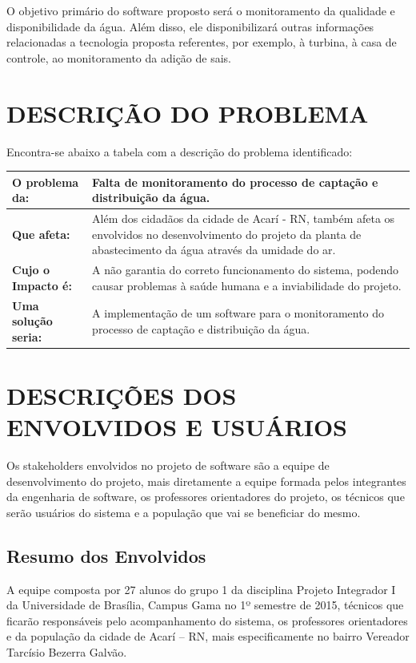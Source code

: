   O objetivo primário do software proposto será o monitoramento da qualidade e disponibilidade da água. Além disso, ele 
  disponibilizará outras informações relacionadas a tecnologia proposta referentes, por exemplo, à turbina, à casa de 
  controle, ao monitoramento da adição de sais.
  
  \section*{DESCRIÇÃO DO PROBLEMA}
  Encontra-se abaixo a tabela com a descrição do problema identificado:
  
   \begin{longtable}{|m{5.0cm}|m{11.2cm}|}
  \hline
\textbf{O problema da:} & Falta de monitoramento do processo de captação e distribuição da água.\\
  \hline
\textbf{Que afeta:} & Além dos cidadãos da cidade de Acarí - RN, também afeta os envolvidos no desenvolvimento do projeto da planta de abastecimento da água através da umidade do ar.\\
  \hline
\textbf{Cujo o Impacto é:} & A não garantia do correto funcionamento do sistema, podendo causar problemas à saúde humana e a inviabilidade do projeto.\\
  \hline
\textbf{Uma solução seria:} & A implementação de um software para o monitoramento do processo de captação e distribuição da água.\\
  \hline
 \end{longtable}
   
  \section*{DESCRIÇÕES DOS ENVOLVIDOS E USUÁRIOS}
  Os stakeholders envolvidos no projeto de software são a equipe de desenvolvimento do projeto, mais diretamente a equipe 
  formada pelos integrantes da engenharia de software, os professores orientadores do projeto, os técnicos que serão usuários 
  do sistema e a população que vai se beneficiar do mesmo.
  
  \subsection*{Resumo dos Envolvidos}
  A equipe composta por 27 alunos do grupo 1 da disciplina Projeto Integrador I da Universidade de Brasília, Campus Gama 
  no 1º semestre de 2015, técnicos que ficarão responsáveis pelo acompanhamento do sistema, os professores orientadores e 
  da população da cidade de Acarí – RN, mais especificamente no bairro Vereador Tarcísio Bezerra Galvão.
  
